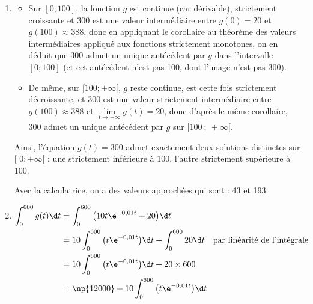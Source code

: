 \begin{enumerate}
\begin{enumerate}
La fonction $g$ est donc strictement croissante sur l'intervalle $[0 ; 100]$, puis strictement décroissante sur $[100~;~+\infty[$.

On calcule $g(0) = 10\times 0 \times \e^{0}+20 = 20$ et $g(100) = 10 \times 100 \times \e^{-1} + 20 = 1000\e^{-1} + 20$ (avec $g(100)\approx 388$).

On peut donc établir le tableau de variations suivant :

\hfill~\hfill~
\end{enumerate}

	\item \begin{itemize}[label=$\bullet~$]
		\item Sur $[0 ; 100]$, la fonction $g$ est continue (car dérivable), strictement croissante et 300 est une valeur intermédiaire entre $g(0) = 20$ et $g(100)\approx 388$, donc en appliquant le corollaire au théorème des valeurs intermédiaires appliqué aux fonctions strictement monotones, on en déduit que 300 admet un unique antécédent par $g$ dans l'intervalle $[0;100]$ (et cet antécédent n'est pas 100, dont l'image n'est pas 300).
		\item De même, sur $[100;+\infty[$, $g$ reste continue, est cette fois strictement décroissante, et 300 est une valeur strictement intermédiaire entre $g(100)\approx 388$ et \linebreak $\lim\limits_{t\to +\infty}g(t) = 20$, donc d'après le même corollaire, $300$ admet un unique antécédent par $g$ sur $[100~;~+\infty[$.
	\end{itemize}

Ainsi, l'équation $g(t) = 300$ admet exactement deux solutions distinctes sur [ $0; + \infty[$ : une strictement inférieure à 100, l'autre strictement supérieure à 100.

Avec la calculatrice, on a des valeurs approchées qui sont : 43 et 193.

	\item $\begin{aligned}[t] \displaystyle \int_{0}^{600} g(t) \d t
	&= \int_{0}^{600} \big(10t\e^{-0,01t} + 20\big) \d t \\
	&= 10 \int_{0}^{600} \big(t\e^{-0,01t}\big) \d t  + \int_{0}^{600} 20 \d t \quad\text{par linéarité de l'intégrale}\\
	&= 10 \int_{0}^{600} \big(t\e^{-0,01t}\big) \d t  + 20\times 600\\
	&= \np{12000} + 10 \int_{0}^{600} \big(t\e^{-0,01t}\big) \d t\\
	\end{aligned}$


\end{enumerate}
